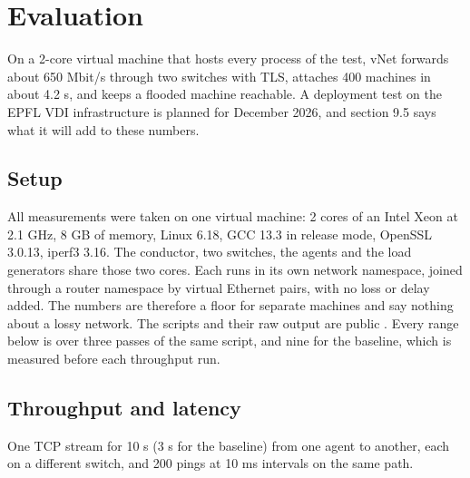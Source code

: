 \documentclass[11pt,a4paper]{article}
\begin{document}
\hypertarget{evaluation}{%
\section{Evaluation}\label{evaluation}}

On a 2-core virtual machine that hosts every process of the test, vNet forwards about 650 Mbit/s through two switches with TLS, attaches 400 machines in about 4.2 s, and keeps a flooded machine reachable. A deployment test on the EPFL VDI infrastructure is planned for December 2026, and section 9.5 says what it will add to these numbers.

\hypertarget{setup}{%
\subsection{Setup}\label{setup}}

All measurements were taken on one virtual machine: 2 cores of an Intel Xeon at 2.1 GHz, 8 GB of memory, Linux 6.18, GCC 13.3 in release mode, OpenSSL 3.0.13, iperf3 3.16. The conductor, two switches, the agents and the load generators share those two cores. Each runs in its own network namespace, joined through a router namespace by virtual Ethernet pairs, with no loss or delay added. The numbers are therefore a floor for separate machines and say nothing about a lossy network. The scripts and their raw output are public \cite{ref10}. Every range below is over three passes of the same script, and nine for the baseline, which is measured before each throughput run.

\hypertarget{throughput-and-latency}{%
\subsection{Throughput and latency}\label{throughput-and-latency}}

One TCP stream for 10 s (3 s for the baseline) from one agent to another, each on a different switch, and 200 pings at 10 ms intervals on the same path.
\end{document}
